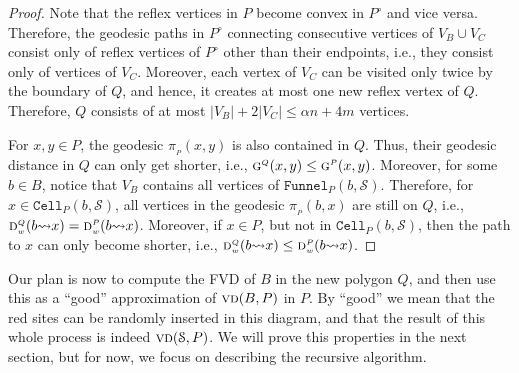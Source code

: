 \documentclass[a4paper,UKenglish]{socg-lipics-v2018}
\newcommand{\s}{\mathcal S}
\newcommand{\g}[3][P]{\ensuremath{\textsc{g}^{\scriptscriptstyle #1}(#2, #3)}}
\newcommand{\dd}[3][P]{\ensuremath{\textsc{d}_{\scriptscriptstyle w}^{\scriptscriptstyle #1}(#2 {\leadsto} #3)}}
\newcommand{\p}[3][P]{\ensuremath{\pi_{_{#1}}(#2, #3)}}
\newcommand{\funnel}[2][P]{\ensuremath{\mathtt{Funnel}_{\scriptscriptstyle #1}(#2)}}
\newcommand{\cell}[2][P]{\ensuremath{\mathtt{Cell}_{\scriptscriptstyle #1}(#2)}}
\newcommand{\vd}[2][P]{\textsc{vd}(#2, #1)}
\begin{document}
{\begin{proof}
Note that the reflex vertices in $P$ become convex in $P^\circ$ and vice versa. 
Therefore, the geodesic paths in $P^\circ$ connecting consecutive vertices of $V_B\cup V_C$ consist only of reflex vertices of $P^\circ$ other than their endpoints, i.e., they consist only of vertices of $V_C$.  
Moreover, each vertex of $V_C$ can be visited only twice by the boundary of $Q$, and hence, it creates at most one new reflex vertex of $Q$.
Therefore, $Q$ consists of at most $|V_B| +  2|V_C| \leq \alpha n + 4m$ vertices.

For $x,y\in P$, the geodesic $\p{x}{y}$ is also contained in $Q$. Thus, their geodesic distance in $Q$ can only get shorter, i.e., $\g[Q]{x}{y} \leq \g{x}{y}$.
Moreover, for some $b\in B$, notice that $V_B$ contains all vertices of $\funnel{b, \s}$. Therefore, for $x\in \cell{b,\s}$, all vertices in the geodesic $\p{b}{x}$ are still on $Q$, i.e., $\dd[Q]{b}{x} = \dd{b}{x}$. Moreover, if $x\in P$, but not in $\cell{b,\s}$, then the path to $x$ can only become shorter, i.e., $\dd[Q]{b}{x} \leq \dd{b}{x}$.
\end{proof}
}



Our plan is now to compute the FVD of $B$ in the new polygon $Q$, and then use this as a ``good'' approximation of $\vd{B}$ in $P$. 
By ``good'' we mean that the red sites can be randomly inserted in this diagram, and that the result of this whole process is indeed $\vd{\s}$. 
We will prove this properties in the next section, but for now, we focus on describing the recursive algorithm.
\end{document}
